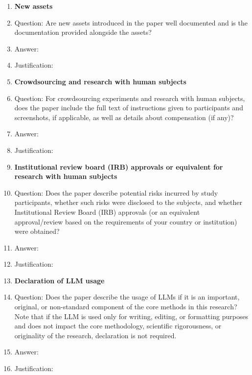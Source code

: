 \documentclass{article}
\begin{document}
\begin{enumerate}
\item {\bf New assets}
    \item[] Question: Are new assets introduced in the paper well documented and is the documentation provided alongside the assets?
    \item[] Answer: \answerTODO{}
    \item[] Justification: \justificationTODO{}

\item {\bf Crowdsourcing and research with human subjects}
    \item[] Question: For crowdsourcing experiments and research with human subjects, does the paper include the full text of instructions given to participants and screenshots, if applicable, as well as details about compensation (if any)?
    \item[] Answer: \answerTODO{}
    \item[] Justification: \justificationTODO{}

\item {\bf Institutional review board (IRB) approvals or equivalent for research with human subjects}
    \item[] Question: Does the paper describe potential risks incurred by study participants, whether such risks were disclosed to the subjects, and whether Institutional Review Board (IRB) approvals (or an equivalent approval/review based on the requirements of your country or institution) were obtained?
    \item[] Answer: \answerTODO{}
    \item[] Justification: \justificationTODO{}

\item {\bf Declaration of LLM usage}
    \item[] Question: Does the paper describe the usage of LLMs if it is an important, original, or non-standard component of the core methods in this research? Note that if the LLM is used only for writing, editing, or formatting purposes and does not impact the core methodology, scientific rigorousness, or originality of the research, declaration is not required.
    \item[] Answer: \answerTODO{}
    \item[] Justification: \justificationTODO{}

\end{enumerate}
\end{document}
